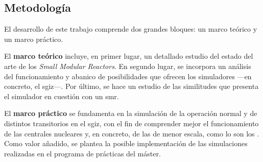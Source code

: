 \subsection{Metodología}

El desarrollo de este trabajo comprende dos grandes bloques: un marco teórico y un marco práctico.

El \textbf{marco teórico} incluye, en primer lugar, un detallado estudio del estado del arte de los \emph{Small Modular Reactors}. En segundo lugar, se incorpora un análisis del funcionamiento y abanico de posibilidades que ofrecen los simuladores ---en concreto, el \acrshort{sgiz}---. Por último, se hace un estudio de las similitudes que presenta el simulador en cuestión con un \acrshort{smr}. 

El \textbf{marco práctico} se fundamenta en la simulación de la operación normal y de distintos transitorios en el \acrshort{sgiz}, con el fin de comprender mejor el funcionamiento de las centrales nucleares y, en concreto, de las de menor escala, como lo son los . Como valor añadido, se plantea la posible implementación de las simulaciones realizadas en el programa de prácticas del máster.